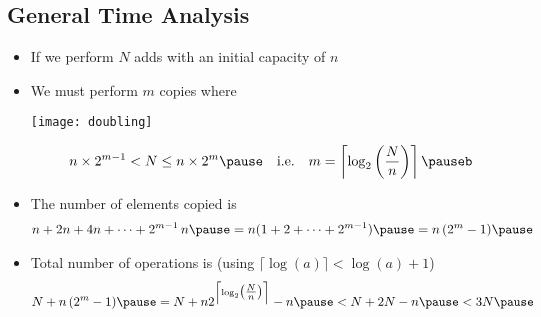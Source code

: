 
\begin{slide}
\section[-2]{General Time Analysis}

\begin{itemize}
\item If we perform $N$ adds with an initial capacity of $n$\pause
\item We must perform $m$ copies where
  \begin{center}
    \texttt{[image: doubling]}
  \end{center}\vspace*{-1cm}
  \begin{align*}
    n\times 2^{m-1} &< N \leq n \times 2^{m}\pause &
    \mbox{i.e.}\quad 
    m = \left\lceil \log_2\left(\strut \frac{N}{n} \right) \right\rceil\pauseb
  \end{align*}
\item The number of elements copied is
  \begin{align*}
    n + 2 n + 4 n + \cdots + 2^{m-1} \, n\pause=n(1 + 2 + \cdots + 2^{m-1})
    \pause = n \, (2^{m}-1)\pause
  \end{align*}
\item Total number of operations is (using $\lceil \log(a) \rceil <
  \log(a) +1$)
  \begin{align*}
    N + n \, (2^{m}-1) \pause= N + n 2^{\left\lceil \log_2\bigl(
      \tfrac{N}{n} \bigr) \right\rceil} -n \pause < N +2 N -n 
    \pause< 3N\pause
\end{align*}
\end{itemize}

\end{slide}


